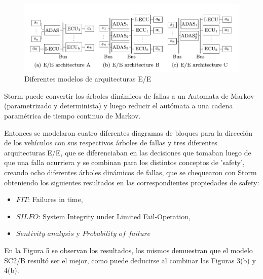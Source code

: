 \documentclass[11pt]{article}
\begin{document}
\begin{figure}[h]
	\includegraphics[scale=0.4]{EE.png}
	\centering
	\caption{Diferentes modelos de arquitecturas E/E}
\end{figure}

Storm puede convertir los \'arboles din\'amicos de fallas a un Automata de Markov (parametrizado y determinista) y luego reducir el aut\'omata a una cadena param\'etrica de tiempo continuo de Markov.

Entonces se modelaron cuatro diferentes diagramas de bloques para la direcci\'on de los veh\'iculos con sus respectivos \'arboles de fallas y tres diferentes arquitecturas E/E, que se diferenciaban en las decisiones que tomaban luego de que una falla ocurriera y se combinan para los distintos conceptos de 'safety', creando ocho diferentes \'arboles din\'amicos de fallas, que se chequearon con Storm obteniendo los siguientes resultados en las correspondientes propiedades de safety:

\begin{itemize}
	\item $FIT$: Failures in time,
	\item $SILFO$: System Integrity under Limited Fail-Operation,
	\item $Sentivity$ $analysis$ y $Probability$ $of$ $failure$
\end{itemize}


En la Figura 5 se observan los resultados, los mismos demuestran que el modelo SC2/B result\'o ser el mejor, como puede deducirse al combinar las Figuras 3(b) y 4(b). 
\end{document}
